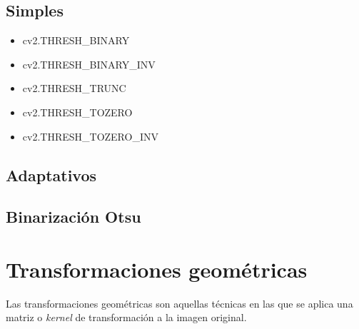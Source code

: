 \subsection{Simples}
\begin{itemize}
\item cv2.THRESH\_BINARY
\item cv2.THRESH\_BINARY\_INV
\item cv2.THRESH\_TRUNC
\item cv2.THRESH\_TOZERO
\item cv2.THRESH\_TOZERO\_INV
\end{itemize}
\subsection{Adaptativos}
\subsection{Binarización Otsu}

\section{Transformaciones geométricas}
Las transformaciones geométricas son aquellas técnicas en las que se
aplica una matriz o \emph{kernel} de transformación a la imagen original.
